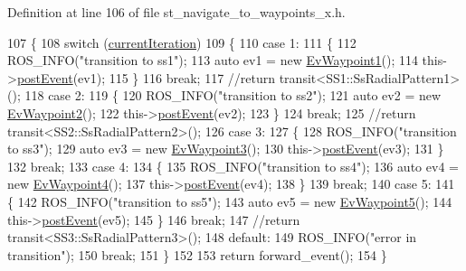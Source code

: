 Definition at line 106 of file st\+\_\+navigate\+\_\+to\+\_\+waypoints\+\_\+x.\+h.


\begin{DoxyCode}
107   \{
108     \textcolor{keywordflow}{switch} (\hyperlink{structStNavigateToWaypointsX_a2f597fd0ee0258ef66506e98d55e8060}{currentIteration})
109     \{
110     \textcolor{keywordflow}{case} 1:
111     \{
112       ROS\_INFO(\textcolor{stringliteral}{"transition to ss1"});
113       \textcolor{keyword}{auto} ev1 = \textcolor{keyword}{new} \hyperlink{structEvWaypoint1}{EvWaypoint1}();
114       this->\hyperlink{classsmacc_1_1SmaccState_ae0e035e2d4e60f4ad58f08f44261f26c}{postEvent}(ev1);
115     \}
116     \textcolor{keywordflow}{break};
117       \textcolor{comment}{//return transit<SS1::SsRadialPattern1>();}
118     \textcolor{keywordflow}{case} 2:
119     \{
120       ROS\_INFO(\textcolor{stringliteral}{"transition to ss2"});
121       \textcolor{keyword}{auto} ev2 = \textcolor{keyword}{new} \hyperlink{structEvWaypoint2}{EvWaypoint2}();
122       this->\hyperlink{classsmacc_1_1SmaccState_ae0e035e2d4e60f4ad58f08f44261f26c}{postEvent}(ev2);
123     \}
124     \textcolor{keywordflow}{break};
125       \textcolor{comment}{//return transit<SS2::SsRadialPattern2>();}
126     \textcolor{keywordflow}{case} 3:
127     \{
128       ROS\_INFO(\textcolor{stringliteral}{"transition to ss3"});
129       \textcolor{keyword}{auto} ev3 = \textcolor{keyword}{new} \hyperlink{structEvWaypoint3}{EvWaypoint3}();
130       this->\hyperlink{classsmacc_1_1SmaccState_ae0e035e2d4e60f4ad58f08f44261f26c}{postEvent}(ev3);
131     \}
132     \textcolor{keywordflow}{break};
133     \textcolor{keywordflow}{case} 4:
134     \{
135       ROS\_INFO(\textcolor{stringliteral}{"transition to ss4"});
136       \textcolor{keyword}{auto} ev4 = \textcolor{keyword}{new} \hyperlink{structEvWaypoint4}{EvWaypoint4}();
137       this->\hyperlink{classsmacc_1_1SmaccState_ae0e035e2d4e60f4ad58f08f44261f26c}{postEvent}(ev4);
138     \}
139     \textcolor{keywordflow}{break};
140     \textcolor{keywordflow}{case} 5:
141     \{
142       ROS\_INFO(\textcolor{stringliteral}{"transition to ss5"});
143       \textcolor{keyword}{auto} ev5 = \textcolor{keyword}{new} \hyperlink{structEvWaypoint5}{EvWaypoint5}();
144       this->\hyperlink{classsmacc_1_1SmaccState_ae0e035e2d4e60f4ad58f08f44261f26c}{postEvent}(ev5);
145     \}
146     \textcolor{keywordflow}{break};
147       \textcolor{comment}{//return transit<SS3::SsRadialPattern3>();}
148     \textcolor{keywordflow}{default}:
149       ROS\_INFO(\textcolor{stringliteral}{"error in transition"});
150       \textcolor{keywordflow}{break};
151     \}
152 
153     \textcolor{keywordflow}{return} forward\_event();
154   \}
\end{DoxyCode}
